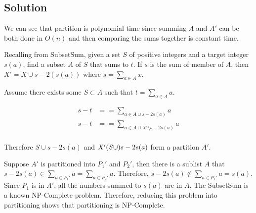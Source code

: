 \subsection*{Solution}

We can see that partition is polynomial time since summing $A$ and $A'$ can be both done in $O(n)$ and then comparing the sums together is constant time.

Recalling from SubsetSum, given a set $S$ of positive integers and a target integer $s(a)$, find a subset $A$ of $S$ that sums to $t$. If $s$ is the sum of member of $A$, then $X'=X \cup {s - 2(s(a))}$ where $s = \sum_{a \in A} x$.

Assume there exists some $S \subset A$ such that $t = \sum_{a \in A} a$.

\begin{align*}
  s - t &== \sum_{a \in A \cup {s-2s(a)}} a \\
  s - t &== \sum_{a \in A \cup X' \setminus {s-2s(a)}} a \\
\end{align*}

Therefore $S \cup {s - 2s(a)}$ and $X'\\(S \cup) {s - 2s(a)}$ form a partition $A'$.

Suppose $A'$ is partitioned into $P_1'$ and $P_2'$, then there is a sublist $A$ that $ {s-2s(a)} \in \sum_{a \in P_1'} a = \sum_{a \in P_2'} a$. Therefore, ${s-2s(a)} \notin \sum_{a \in P_1'} a = s(a)$. Since $P_1$ is in $A'$, all the numbers summed to $s(a)$ are in $A$. The SubsetSum is a known NP-Complete problem. Therefore, reducing this problem into partitioning shows that partitioning is NP-Complete.
